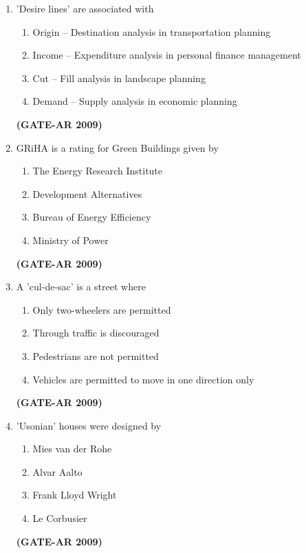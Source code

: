 \documentclass[a4paper,10pt]{article}
\begin{document}
\begin{enumerate}
    \item 'Desire lines' are associated with 
    \begin{enumerate}
        \item Origin – Destination analysis in transportation planning
        \item Income – Expenditure analysis in personal finance management
        \item Cut – Fill analysis in landscape planning
        \item Demand – Supply analysis in economic planning
    \end{enumerate}
    \hfill \textbf{(GATE-AR 2009)}

	\item GRiHA is a rating for Green Buildings given by 
    \begin{multicols}{2}
	\begin{enumerate}
        \item The Energy Research Institute
        \item Development Alternatives
        \item Bureau of Energy Efficiency
        \item Ministry of Power
    \end{enumerate}
	\end{multicols}
    \hfill \textbf{(GATE-AR 2009)}
    
    \item A 'cul-de-sac' is a street where 
    \begin{enumerate}
        \item Only two-wheelers are permitted
        \item Through traffic is discouraged
        \item Pedestrians are not permitted
        \item Vehicles are permitted to move in one direction only
    \end{enumerate}
    \hfill \textbf{(GATE-AR 2009)}

    \item 'Usonian' houses were designed by 
    \begin{multicols}{2}
	\begin{enumerate}
        \item Mies van der Rohe
        \item Alvar Aalto
        \item Frank Lloyd Wright
        \item Le Corbusier
    \end{enumerate}
	\end{multicols}
    \hfill \textbf{(GATE-AR 2009)}
    

\end{enumerate}
\end{document}
